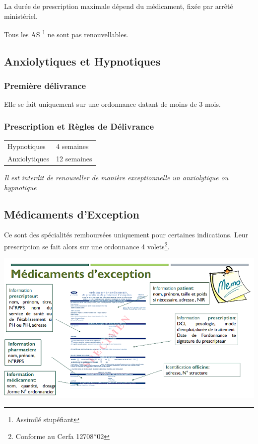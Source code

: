 \documentclass[11pt]{article}
\begin{document}
La durée de prescription maximale dépend du médicament, fixée par arrêté ministériel.

Tous les AS \footnote{Assimilé stupéfiant} ne sont pas renouvellables.

\subsection{Anxiolytiques et Hypnotiques}
\label{sec:orgfde35f5}

\subsubsection{Première délivrance}
\label{sec:orgaf78f16}
Elle se fait uniquement sur une ordonnance datant de moins de 3 mois.

\subsubsection{Prescription et Règles de Délivrance}
\label{sec:org44108b6}
\begin{center}
\begin{tabular}{ll}
Hypnotiques & 4 semaines\\
Anxiolytiques & 12 semaines\\
\end{tabular}
\end{center}

\emph{Il est interdit de renouveller de manière exceptionnelle un anxiolytique ou hypnotique}

\subsection{Médicaments d'Exception}
\label{sec:org273b1ac}
Ce sont des spécialités remboursées uniquement pour certaines indications.
Leur prescription se fait alors sur une ordonnance 4 volets\footnote{Conforme au Cerfa 12708*02}.

\begin{center}
\includegraphics[width=.9\linewidth]{./exception.png}
\end{center}
\end{document}
